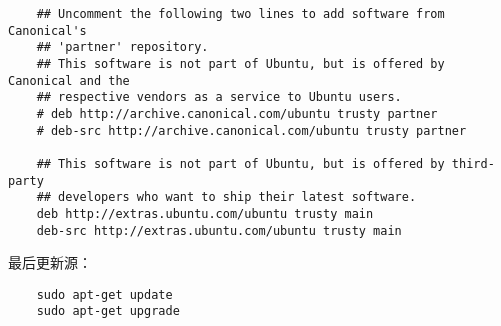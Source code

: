 \documentclass[a4paper,left=2.5cm,right=2.5cm,11pt]{article}
\begin{document}
\begin{lstlisting}
	## Uncomment the following two lines to add software from Canonical's
	## 'partner' repository.
	## This software is not part of Ubuntu, but is offered by Canonical and the
	## respective vendors as a service to Ubuntu users.
	# deb http://archive.canonical.com/ubuntu trusty partner
	# deb-src http://archive.canonical.com/ubuntu trusty partner

	## This software is not part of Ubuntu, but is offered by third-party
	## developers who want to ship their latest software.
	deb http://extras.ubuntu.com/ubuntu trusty main
	deb-src http://extras.ubuntu.com/ubuntu trusty main
	\end{lstlisting}

	最后更新源：
	\begin{lstlisting}
	sudo apt-get update
	sudo apt-get upgrade
	\end{lstlisting}
\end{document}
